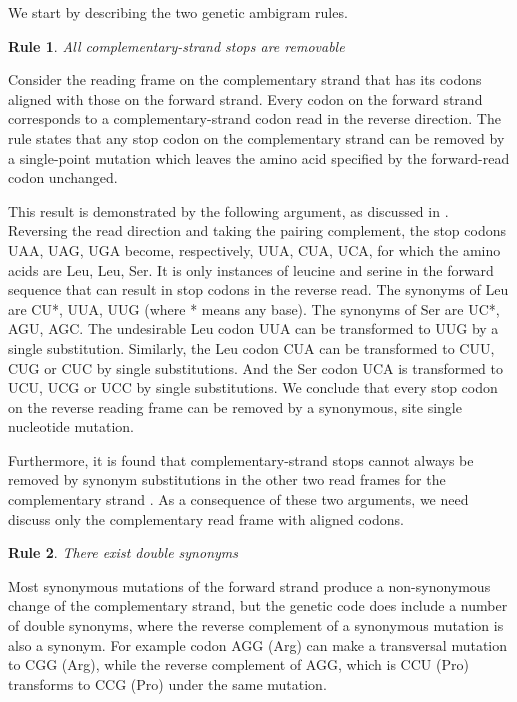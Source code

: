 \documentclass[unnumsec,webpdf,contemporary,large,namedate]{oup-authoring-template}%
\theoremstyle{thmstyleone}%
\newtheorem{ambirule}{Rule}%
\theoremstyle{thmstyletwo}%
\theoremstyle{thmstylethree}%
\begin{document}
We start by describing the two genetic ambigram rules.

\begin{ambirule}All complementary-strand stops are removable \label{rule1}
\end{ambirule}

Consider the reading frame on the complementary strand that has its 
codons aligned with those on the forward strand. Every codon on the forward 
strand corresponds to a complementary-strand codon read in the reverse 
direction. The rule states that any stop codon on the complementary strand 
can be removed by a single-point mutation which leaves the amino acid specified by the 
forward-read codon unchanged. 

This result is demonstrated by the following argument, as discussed in \cite{DeR+19}. Reversing the read direction 
and taking the pairing complement, the stop codons UAA, UAG, UGA become, respectively, 
UUA, CUA, UCA, for which the amino acids are Leu, Leu, Ser. It is only instances of leucine and 
serine in the forward sequence that can result in stop codons in the reverse read. 
The synonyms of Leu are  CU*,  UUA, UUG (where * means any base).
The synonyms of Ser are UC*, AGU, AGC. The undesirable Leu codon UUA can be transformed 
to UUG by a single substitution. Similarly, the Leu codon CUA can be transformed to 
CUU, CUG or CUC by single substitutions. And the Ser codon UCA is transformed to UCU, UCG or UCC
by single substitutions. We conclude that every stop codon on the reverse reading frame can be removed 
by a synonymous, site single nucleotide mutation. 

Furthermore, it is found that complementary-strand stops cannot always be removed by synonym substitutions 
in the other two read frames for the complementary strand \citep[each case requires a separate and somewhat 
involved argument, also given in][]{DeR+19}. As a consequence of these two arguments, we need discuss only the 
complementary read frame with aligned codons.

\begin{ambirule}There exist double synonyms\label{rule2}
\end{ambirule}

Most synonymous mutations of the forward strand produce a non-synonymous change of the 
complementary strand, but the genetic code does include a number of double synonyms, 
where the reverse complement of a synonymous mutation is also a synonym. 
For example codon AGG (Arg) can make a transversal mutation to CGG (Arg), 
while the reverse complement of AGG, which is CCU (Pro) transforms to CCG (Pro) under 
the same mutation. 
\end{document}
